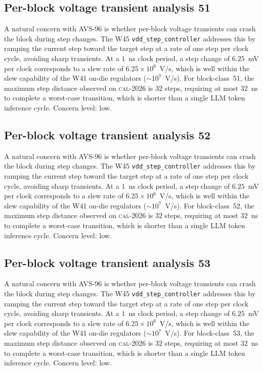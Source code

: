 \subsection{Per-block voltage transient analysis 51}

A natural concern with AVS-96 is whether per-block voltage transients
can crash the block during step changes. The W45 \texttt{vdd\_step\_controller} addresses this by ramping the current
step toward the target step at a rate of one step per clock cycle,
avoiding sharp transients. At a $1$~ns clock period, a step change of
$6.25$~mV per clock corresponds to a slew rate of $6.25\times 10^6$~V/s,
which is well within the slew capability of the W41 on-die regulators
($\sim 10^7$~V/s). For block-class~51, the maximum step distance
observed on \textsc{cal-2026} is $32$ steps, requiring at most $32$~ns
to complete a worst-case transition, which is shorter than a single
LLM token inference cycle. Concern level: low.


\subsection{Per-block voltage transient analysis 52}

A natural concern with AVS-96 is whether per-block voltage transients
can crash the block during step changes. The W45 \texttt{vdd\_step\_controller} addresses this by ramping the current
step toward the target step at a rate of one step per clock cycle,
avoiding sharp transients. At a $1$~ns clock period, a step change of
$6.25$~mV per clock corresponds to a slew rate of $6.25\times 10^6$~V/s,
which is well within the slew capability of the W41 on-die regulators
($\sim 10^7$~V/s). For block-class~52, the maximum step distance
observed on \textsc{cal-2026} is $32$ steps, requiring at most $32$~ns
to complete a worst-case transition, which is shorter than a single
LLM token inference cycle. Concern level: low.


\subsection{Per-block voltage transient analysis 53}

A natural concern with AVS-96 is whether per-block voltage transients
can crash the block during step changes. The W45 \texttt{vdd\_step\_controller} addresses this by ramping the current
step toward the target step at a rate of one step per clock cycle,
avoiding sharp transients. At a $1$~ns clock period, a step change of
$6.25$~mV per clock corresponds to a slew rate of $6.25\times 10^6$~V/s,
which is well within the slew capability of the W41 on-die regulators
($\sim 10^7$~V/s). For block-class~53, the maximum step distance
observed on \textsc{cal-2026} is $32$ steps, requiring at most $32$~ns
to complete a worst-case transition, which is shorter than a single
LLM token inference cycle. Concern level: low.


